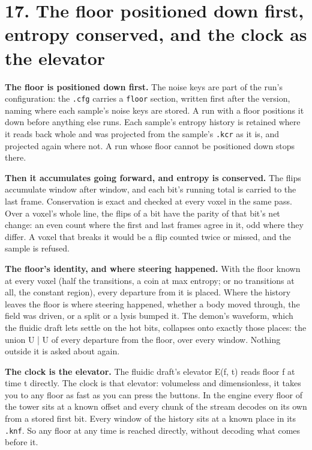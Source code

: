 \section{\texorpdfstring{17. The floor positioned down first, entropy conserved, and the clock as the elevator}{17. The floor positioned down first, entropy conserved, and the clock as the elevator}}

\textbf{The floor is positioned down first.} The noise keys are part of the run's configuration: the \texttt{.\allowbreak{}cfg} carries a \texttt{floor} section, written first after the version, naming where each sample's noise keys are stored. A run with a floor positions it down before anything else runs. Each sample's entropy history is retained where it reads back whole and was projected from the sample's \texttt{.\allowbreak{}kcr} as it is, and projected again where not. A run whose floor cannot be positioned down stops there.

\textbf{Then it accumulates going forward, and entropy is conserved.} The flips accumulate window after window, and each bit's running total is carried to the last frame. Conservation is exact and checked at every voxel in the same pass. Over a voxel's whole line, the flips of a bit have the parity of that bit's net change: an even count where the first and last frames agree in it, odd where they differ. A voxel that breaks it would be a flip counted twice or missed, and the sample is refused.

\textbf{The floor's identity, and where steering happened.} With the floor known at every voxel (half the transitions, a coin at max entropy; or no transitions at all, the constant region), every departure from it is placed. Where the history leaves the floor is where steering happened, whether a body moved through, the field was driven, or a split or a lysis bumped it. The demon's waveform, which the fluidic draft lets settle on the hot bits, collapses onto exactly those places: the union U | U of every departure from the floor, over every window. Nothing outside it is asked about again.

\textbf{The clock is the elevator.} The fluidic draft's elevator E(f, t) reads floor f at time t directly. The clock is that elevator: volumeless and dimensionless, it takes you to any floor as fast as you can press the buttons. In the engine every floor of the tower sits at a known offset and every chunk of the stream decodes on its own from a stored first bit. Every window of the history sits at a known place in its \texttt{.\allowbreak{}knf}. So any floor at any time is reached directly, without decoding what comes before it.

